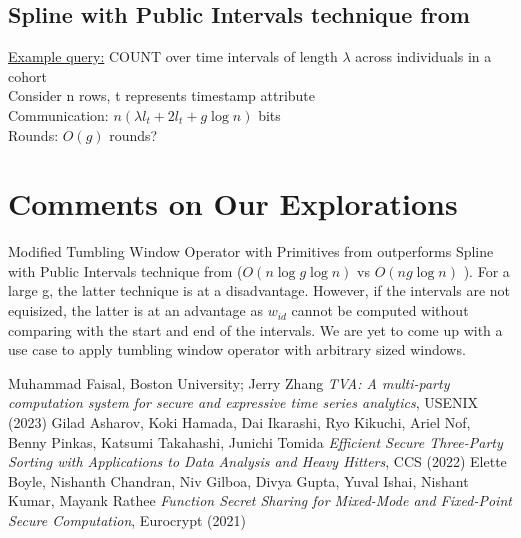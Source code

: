 \documentclass{article}
\begin{document}
\subsection{Spline with Public Intervals technique from \cite{Eu21}}
\underline{Example query:} COUNT over time intervals of length $\lambda$ across individuals in a cohort \\
Consider n rows, t represents timestamp attribute \\ 
Communication: $n(\lambda l_t + 2l_t + g \log n)$ bits \\
Rounds: $O(g)$ rounds?

\section{Comments on Our Explorations}
Modified Tumbling Window Operator with Primitives from \cite{Ha22} outperforms Spline with Public Intervals technique from \cite{Eu21} ($O(n\log g\log n)$ vs $O(ng\log n)$ ). For a large g, the latter technique is at a disadvantage. However, if the intervals are not equisized, the latter is at an advantage as $w_{id}$ cannot be computed without comparing with the start and end of the intervals. We are yet to come up with a use case to apply tumbling window operator with arbitrary sized windows.

\begin{thebibliography}{99}

 Muhammad Faisal, Boston University; Jerry Zhang \emph{TVA: A multi-party computation system for secure and expressive time series analytics}, {USENIX} (2023)
 Gilad Asharov, Koki Hamada, Dai Ikarashi, Ryo Kikuchi, Ariel Nof, Benny Pinkas, Katsumi Takahashi, Junichi Tomida \emph{Efficient Secure Three-Party Sorting with Applications to Data Analysis and Heavy Hitters}, {CCS} (2022)
 Elette Boyle, Nishanth Chandran, Niv Gilboa, Divya Gupta, Yuval Ishai, Nishant Kumar, Mayank Rathee \emph{Function Secret Sharing for Mixed-Mode and Fixed-Point Secure Computation}, {Eurocrypt} (2021)

\end{thebibliography}
\end{document}
